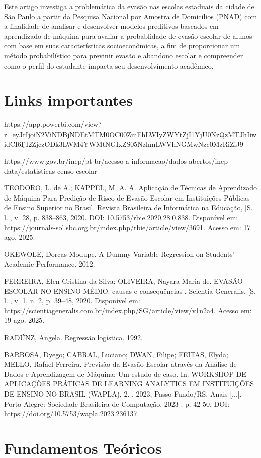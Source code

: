 \documentclass[english, spanish, brazilian]{RBIEarticle} %
\begin{document}
Este artigo investiga a problemática da evasão nas escolas estaduais da cidade de São Paulo a partir da Pesquisa Nacional por Amostra de Domicílios (PNAD) com a finalidade de analisar e desenvolver modelos preditivos baseados em aprendizado de máquina para avaliar a probablidade de evasão escolar de alunos com base em suas características socioeconômicas, a fim de proporcionar um método probabilístico para previnir evasão e abandono escolar e compreender como o perfil do estudante impacta seu desenvolvimento acadêmico. 

\section{Links importantes}
https://app.powerbi.com/view?r=eyJrIjoiN2ViNDBjNDEtMTM0OC00ZmFhLWIyZWYtZjI1YjU0NzQzMTJhIiwidCI6IjI2ZjczODk3LWM4YWMtNGIxZS05NzhmLWVhNGMwNzc0MzRiZiJ9

https://www.gov.br/inep/pt-br/acesso-a-informacao/dados-abertos/inep-data/estatisticas-censo-escolar

TEODORO, L. de A.; KAPPEL, M. A. A. Aplicação de Técnicas de Aprendizado de Máquina Para Predição de Risco de Evasão Escolar em Instituições Públicas de Ensino Superior no Brasil. Revista Brasileira de Informática na Educação, [S. l.], v. 28, p. 838–863, 2020. DOI: 10.5753/rbie.2020.28.0.838. Disponível em: https://journals-sol.sbc.org.br/index.php/rbie/article/view/3691. Acesso em: 17 ago. 2025.

OKEWOLE, Dorcas Modupe. A Dummy Variable Regression on Students' Academic Performance. 2012.

FERREIRA, Elen Cristina da Silva; OLIVEIRA, Nayara Maria de. EVASÃO ESCOLAR NO ENSINO MÉDIO: causas e consequências . Scientia Generalis, [S. l.], v. 1, n. 2, p. 39–48, 2020. Disponível em: https://scientiageneralis.com.br/index.php/SG/article/view/v1n2a4. Acesso em: 19 ago. 2025.

RADÜNZ, Angela. Regressão logística. 1992.

BARBOSA, Dyego; CABRAL, Luciano; DWAN, Filipe; FEITAS, Elyda; MELLO, Rafael Ferreira. Previsão da Evasão Escolar através da Análise de Dados e Aprendizagem de Máquina: Um estudo de caso. In: WORKSHOP DE APLICAÇÕES PRÁTICAS DE LEARNING ANALYTICS EM INSTITUIÇÕES DE ENSINO NO BRASIL (WAPLA), 2. , 2023, Passo Fundo/RS. Anais [...]. Porto Alegre: Sociedade Brasileira de Computação, 2023 . p. 42-50. DOI: https://doi.org/10.5753/wapla.2023.236137.

\section{Fundamentos Teóricos}
\end{document}
